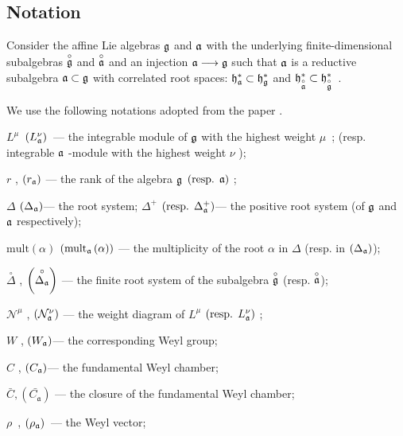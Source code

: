 \documentclass[a4paper,12pt]{article}
\theoremstyle{definition} \newtheorem{Def}{Definition}
\begin{document}
\subsection{Notation}
\label{sec:notation}

Consider the affine Lie algebras $\frak{g}$ and $\frak{a}$ with the
underlying finite-dimensional subalgebras $\overset{\circ }{\frak{g}}$ and $%
\overset{\circ }{\frak{a}}$ and an injection $\frak{a}\longrightarrow \frak{g%
}$ such that $\frak{a}$ is a reductive subalgebra $\frak{a\subset g}$ with
correlated root spaces: $\frak{h}_{\frak{a}}^{\ast }\subset \frak{h}_{\frak{g%
}}^{\ast }$ and $\frak{h}_{\overset{\circ }{\frak{a}}}^{\ast }\subset \frak{h%
}_{\overset{\circ }{\frak{g}}}^{\ast }$\ .

We use the following notations adopted from the paper \cite{ilyin812pbc}.

$L^{\mu }$\ $\left( L_{\frak{a}}^{\nu }\right) $\ --- the integrable module
of $\frak{g}$ with the highest weight $\mu $\ ; (resp. integrable $\frak{a}$
-module with the highest weight $\nu $ );

$r$ , $\left( r_{\frak{a}}\right) $ --- the rank of the algebra $\frak{g}$ $%
\left( \text{resp. }\frak{a}\right) $ ;

$\Delta $ $\left( \Delta _{\frak{a}}\right) $--- the root system; $\Delta
^{+} $ $\left( \text{resp. }\Delta _{\frak{a}}^{+}\right) $--- the positive
root system (of $\frak{g}$ and $\frak{a}$ respectively);

$\mathrm{mult}\left( \alpha \right) $ $\left( \mathrm{mult}_{\frak{a}}\left(
\alpha \right) \right) $ --- the multiplicity of the root $\alpha$ in $\Delta 
$ (resp. in $\left( \Delta _{\frak{a}}\right) $);

$\overset{\circ }{\Delta }$ , $\left( \overset{\circ }{\Delta _{\frak{a}}}%
\right) $ --- the finite root system of the subalgebra $\overset{\circ }{%
\frak{g}}$ (resp. $\overset{\circ }{\frak{a}}$);

$\mathcal{N}^{\mu }$ , $\left( \mathcal{N}_{\frak{a}}^{\nu }\right) $ --- the
weight diagram of $L^{\mu }$ $\left( \text{resp. }L_{\frak{a}}^{\nu }\right) 
$ ;

$W$ , $\left( W_{\frak{a}}\right) $--- the corresponding Weyl group;

$C$ , $\left( C_{\frak{a}}\right) $--- the fundamental Weyl chamber;

$\bar{C}, \left(\bar{C_{\mathfrak{a}}}\right)$ --- the closure of the fundamental Weyl chamber;

$\rho $\ , $\left( \rho _{\frak{a}}\right) $\ --- the Weyl vector;
\end{document}
